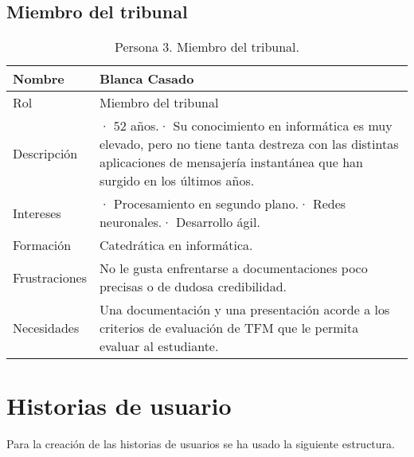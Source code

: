 \subsection{Miembro del tribunal}
\label{sec:personaMiembroTribunal}
\FloatBarrier
\begin{table}[h]
    \centering
    \def\arraystretch{1.25}
    \begin{adjustbox}{max width=\textwidth}
    \begin{tabularx}{\textwidth}{|l|L|}
    \hline
        \textbf{Nombre} & \textbf{Blanca Casado} \\ \hline
    \hline
        Rol & Miembro del tribunal \\ \hline
        Descripción & · 52 años.\linebreak · Su conocimiento en informática es muy elevado, pero no tiene tanta destreza con las distintas aplicaciones de mensajería instantánea que han surgido en los últimos años. \\ \hline
        Intereses & · Procesamiento en segundo plano.\linebreak · Redes neuronales.\linebreak · Desarrollo ágil. \\ \hline
        Formación & Catedrática en informática. \\ \hline
        Frustraciones & No le gusta enfrentarse a documentaciones poco precisas o de dudosa credibilidad. \\ \hline
        Necesidades & Una documentación y una presentación acorde a los criterios de evaluación de TFM que le permita evaluar al estudiante. \\ \hline
    \end{tabularx}
    \end{adjustbox}
    \caption{Persona 3. Miembro del tribunal.}
\end{table}
\FloatBarrier

\section{Historias de usuario}

Para la creación de las historias de usuarios se ha usado la siguiente estructura.

